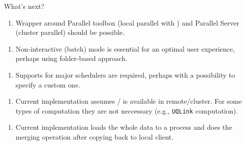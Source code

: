 \documentclass{rsuqbeamernew}
\begin{document}
\begin{frame}[t]{What's next?}
	\small
  \begin{enumerate}
    \item[] Wrapper around \matlab{} Parallel toolbox (local parallel with
     ) and Parallel Server (cluster parallel)
    should be possible.
  \end{enumerate}
    
  \begin{enumerate}
    \item[] Non-interactive (batch) mode is essential for an optimal user
    experience, perhaps using folder-based approach.
  \end{enumerate}
  
  \begin{enumerate}
    \item[] Supports for major schedulers are required,
    perhaps with a possibility to specify a custom one.
  \end{enumerate}
      
  \begin{enumerate}
    \item[] Current implementation assumes \matlab/\uqlab{} is available
    in remote/cluster. For some types of computation they are not neccessary
    (e.g., \texttt{UQLink} computation).
  \end{enumerate}
    
  \begin{enumerate}
    \item[] Current implementation loads the whole data to a process and does
    the merging operation after copying back to local client.
  \end{enumerate}
\end{frame}
\end{document}
